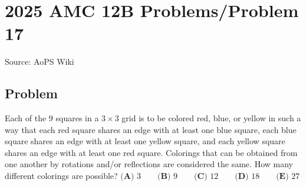 \documentclass[12pt]{article}
\begin{document}
\section*{{2025 AMC 12B Problems/Problem 17}}
Source: AoPS Wiki

\subsection*{Problem}
Each of the $9$ squares in a ${3 \times 3}$ grid is to be colored red, blue, or yellow in such a way that each red square shares an edge with at least one blue square, each blue square shares an edge with at least one yellow square, and each yellow square shares an edge with at least one red square. Colorings that can be obtained from one another by rotations and/or reflections are considered the same. How many different colorings are possible? $\textbf{(A) } 3 \qquad \textbf{(B) } 9 \qquad \textbf{(C) } 12 \qquad \textbf{(D) } 18 \qquad \textbf{(E) } 27$
\end{document}
